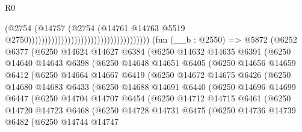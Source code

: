 \begin{lexlean}{R0}
\begin{coremodule}
                                                                      (@2754
                                                                        (@14757
                                                                          (@2754
                                                                            (@14761
                                                                              @14763
                                                                              @5519
                                                                              @2750)))))))))))))))))))))))))))))))))))))
    (fun (__b : @2550) =>
    @5872
      (@6252
        @6377
        (@6250
          @14624
          @14627
          @6384
          (@6250
            @14632
            @14635
            @6391
            (@6250
              @14640
              @14643
              @6398
              (@6250
                @14648
                @14651
                @6405
                (@6250
                  @14656
                  @14659
                  @6412
                  (@6250
                    @14664
                    @14667
                    @6419
                    (@6250
                      @14672
                      @14675
                      @6426
                      (@6250
                        @14680
                        @14683
                        @6433
                        (@6250
                          @14688
                          @14691
                          @6440
                          (@6250
                            @14696
                            @14699
                            @6447
                            (@6250
                              @14704
                              @14707
                              @6454
                              (@6250
                                @14712
                                @14715
                                @6461
                                (@6250
                                  @14720
                                  @14723
                                  @6468
                                  (@6250
                                    @14728
                                    @14731
                                    @6475
                                    (@6250
                                      @14736
                                      @14739
                                      @6482
                                      (@6250
                                        @14744
                                        @14747

\end{coremodule}
\end{lexlean}

